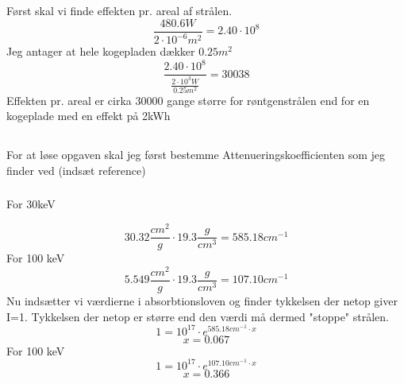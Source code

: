 \documentclass[a4paper,twoside]{article}
\begin{document}
\subsection{}
Først skal vi finde effekten pr. areal af strålen. 
\begin{equation*}
    \frac{480.6W}{2\cdot10^{-6}m^2}=2.40\cdot10^{8}

\end{equation*}
Jeg antager at hele kogepladen dækker $0.25 m^2$
\begin{equation*}
    \frac{2.40\cdot10^{8}}{\frac{2\cdot10^3W}{0.25m^2}}=30038
\end{equation*}
Effekten pr. areal er cirka 30000 gange større for røntgenstrålen end for en kogeplade med en effekt på 2kWh

\subsection{}
For at løse opgaven skal jeg først bestemme Attenueringskoefficienten som jeg finder ved (indsæt reference)
\subsubsection*{}For 30keV

\begin{equation*}
    30.32\frac{cm^2}{g}\cdot19.3\frac{g}{cm^3}=585.18cm^{-1}
\end{equation*}
For 100 keV
\begin{equation*}
    5.549\frac{cm^2}{g}\cdot19.3\frac{g}{cm^3}=107.10cm^{-1}
\end{equation*}
Nu indsætter vi værdierne i absorbtionsloven og finder tykkelsen der netop giver I=1. Tykkelsen der netop er større end den værdi må dermed "stoppe" strålen. 
\begin{equation*}
  1=10^{17}\cdot e^{585.18cm^{-1}\cdot x}
\end{equation*}
\begin{equation*}
    x=0.067
\end{equation*}
For 100 keV
\begin{equation*}
     1=10^{17}\cdot e^{107.10cm^{-1}\cdot x}
\end{equation*}
\begin{equation*}
    x=0.366
\end{equation*}
\newpage
\section{}
%
\end{document}
